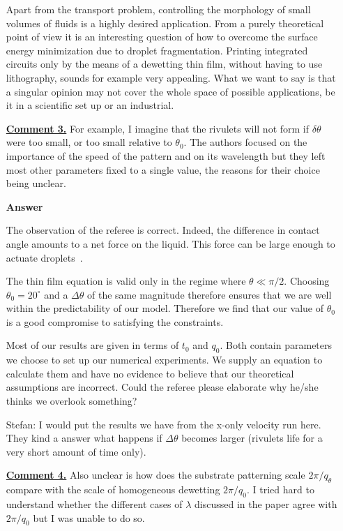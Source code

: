\documentclass[12pt,english]{article}
\begin{document}
\begin{itemize}
{Apart from the transport problem, controlling the morphology of small volumes of fluids is a highly desired application.
From a purely theoretical point of view it is an interesting question of how to overcome the surface energy minimization due to droplet fragmentation. 
Printing integrated circuits only by the means of a dewetting thin film, without having to use lithography, sounds for example very appealing.
What we want to say is that a singular opinion may not cover the whole space of possible applications, be it in a scientific set up or an industrial.
}

\item[ \textbf{\underline{Comment 3.}}]
{ 
For example, I imagine that the rivulets will not form if $\delta\theta$ were too small, or too small relative to $\theta_0$. 
The authors focused on the importance of the speed of the pattern and on its wavelength but they left most other parameters fixed to a single value, the reasons for their choice being unclear.
}

\item[ \textbf{{Answer}}]
{ 
The observation of the referee is correct.
Indeed, the difference in contact angle amounts to a net force on the liquid.
This force can be large enough to actuate droplets~\cite{doi:10.1021/acs.langmuir.5b02335}.

The thin film equation is valid only in the regime where $\theta \ll \pi/2$.
Choosing $\theta_0 = 20^{\circ}$ and a $\Delta\theta$ of the same magnitude therefore ensures that we are well within the predictability of our model.
Therefore we find that our value of $\theta_0$ is a good compromise to satisfying the constraints.

Most of our results are given in terms of $t_0$ and $q_0$.
Both contain parameters we choose to set up our numerical experiments. 
We supply an equation to calculate them and have no evidence to believe that our theoretical assumptions are incorrect.
Could the referee please elaborate why he/she thinks we overlook something?

\textcolor{pyorange}{Stefan}: I would put the results we have from the x-only velocity run here.
They kind a answer what happens if $\Delta\theta$ becomes larger (rivulets life for a very short amount of time only).
}

\item[ \textbf{\underline{Comment 4.}}]
{ 
Also unclear is how does the substrate patterning scale $2\pi/q_\theta$ compare with the scale of homogeneous dewetting $2\pi/q_0$.
I tried hard to understand whether the different cases of $\lambda$ discussed in the paper agree with $2\pi/q_0$ but I was unable to do so. 
}


\end{itemize}
\end{document}
